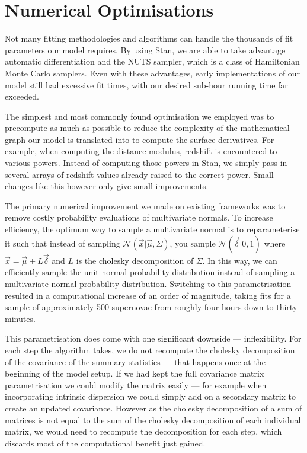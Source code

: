 \documentclass[a4paper,fleqn,usenatbib]{emulateapj}
\begin{document}
\section{Numerical Optimisations}
\label{app:optimisations}


Not many fitting methodologies and algorithms can handle the thousands of fit parameters our model requires. By using Stan, we are able to take advantage automatic differentiation and the NUTS sampler, which is a class of Hamiltonian Monte Carlo samplers. Even with these advantages, early implementations of our model still had excessive fit times, with our desired sub-hour running time far exceeded. 

The simplest and most commonly found optimisation we employed was to precompute as much as possible to reduce the complexity of the mathematical graph our model is translated into to compute the surface derivatives. For example, when computing the distance modulus, redshift is encountered to various powers. Instead of computing those powers in Stan, we simply pass in several arrays of redshift values already raised to the correct power. Small changes like this however only give small improvements.

The primary numerical improvement we made on existing frameworks was to remove costly probability evaluations of multivariate normals. To increase efficiency, the optimum way to sample a multivariate normal is to reparameterise it such that instead of sampling $\mathcal{N}(\vec{x}|\vec{\mu}, \Sigma)$, you sample $\mathcal{N}(\vec{\delta}|0,1)$ where $\vec{x} = \vec{\mu} + L \vec{\delta}$ and $L$ is the cholesky decomposition of $\Sigma$. In this way, we can efficiently sample the unit normal probability distribution instead of sampling a multivariate normal probability distribution. Switching to this parametrisation resulted in a computational increase of an order of magnitude, taking fits for a sample of approximately 500 supernovae from roughly four hours down to thirty minutes. 

This parametrisation does come with one significant downside --- inflexibility. For each step the algorithm takes, we do not recompute the cholesky decomposition of the covariance of the summary statistics --- that happens once at the beginning of the model setup. If we had kept the full covariance matrix parametrisation we could modify the matrix easily --- for example when incorporating intrinsic dispersion we could simply add on a secondary matrix to create an updated covariance. However as the cholesky decomposition of a sum of matrices is not equal to the sum of the cholesky decomposition of each individual matrix, we would need to recompute the decomposition for each step, which discards most of the computational benefit just gained.
\end{document}
